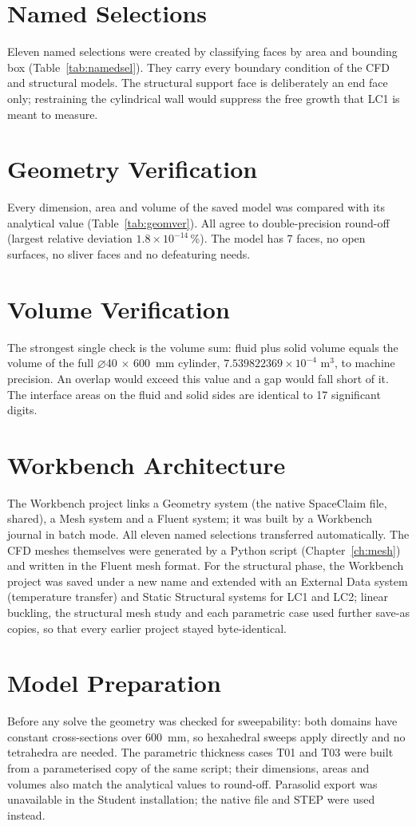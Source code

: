 \section{Named Selections}
Eleven named selections were created by classifying faces by area and bounding box (Table~\ref{tab:namedsel}). They carry every boundary
condition of the CFD and structural models. The structural support face is deliberately an end face only; restraining the cylindrical wall
would suppress the free growth that LC1 is meant to measure.



\section{Geometry Verification}
Every dimension, area and volume of the saved model was compared with its analytical value (Table~\ref{tab:geomver}). All agree to
double-precision round-off (largest relative deviation $1.8\times10^{-14}$\,\%). The model has 7 faces, no open surfaces, no sliver faces and
no defeaturing needs.



\section{Volume Verification}
The strongest single check is the volume sum: fluid plus solid volume equals the volume of the full $\diameter$40 $\times$ 600~mm cylinder,
$7.539822369\times10^{-4}$ m$^3$, to machine precision. An overlap would exceed this value and a gap would fall short of it. The interface
areas on the fluid and solid sides are identical to 17 significant digits.

\section{Workbench Architecture}
The Workbench project links a Geometry system (the native SpaceClaim file, shared), a Mesh system and a Fluent system; it was built by a
Workbench journal in batch mode. All eleven named selections transferred automatically. The CFD meshes themselves were generated by a
Python script (Chapter~\ref{ch:mesh}) and written in the Fluent mesh format. For the structural phase, the Workbench project was saved under
a new name and extended with an External Data system (temperature transfer) and Static Structural systems for LC1 and LC2; linear buckling,
the structural mesh study and each parametric case used further save-as copies, so that every earlier project stayed byte-identical.

\section{Model Preparation}
Before any solve the geometry was checked for sweepability: both domains have constant cross-sections over 600~mm, so hexahedral sweeps apply
directly and no tetrahedra are needed. The parametric thickness cases T01 and T03 were built from a parameterised copy of the same script; their
dimensions, areas and volumes also match the analytical values to round-off. Parasolid export was unavailable in the Student installation;
the native file and STEP were used instead.
